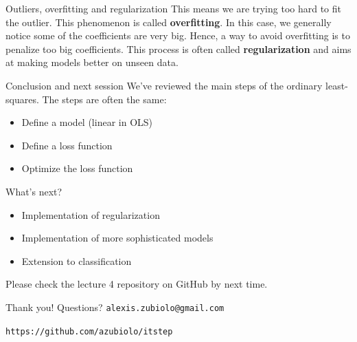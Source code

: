 \documentclass{beamer}
\newcommand{\1}[1]{\mathbbm{1}\left[#1\right]}
\begin{document}
\begin{frame}{Outliers, overfitting and regularization}
This means we are trying too hard to fit the outlier. 
\pause
\vfill
This phenomenon is called \textbf{overfitting}. In this case, we generally notice some of the coefficients are very big. Hence, a way to avoid overfitting is to penalize too big coefficients. This process is often called \textbf{regularization} and aims at making models better on unseen data.
\end{frame}

\begin{frame}{Conclusion and next session}
We've reviewed the main steps of the ordinary least-squares. The steps are often the same:
\begin{itemize}
	\item Define a model (linear in OLS)
	\item Define a loss function
	\item Optimize the loss function
\end{itemize}
\pause
\vfill
What's next?
\begin{itemize}
	\item Implementation of regularization
	\item Implementation of more sophisticated models
	\item Extension to classification
\end{itemize}
\pause
\vfill
Please check the lecture 4 repository on GitHub by next time.
\end{frame}

\begin{frame}
\vfill
\centering
\begin{huge}
\huge{Thank you! Questions?}
\vfill
\texttt{alexis.zubiolo@gmail.com}
\end{huge}
\vfill
\begin{Large}
\texttt{https://github.com/azubiolo/itstep}
\end{Large}
\vfill
\end{frame}
\end{document}
